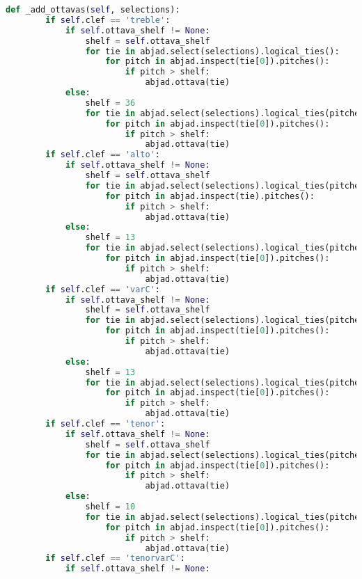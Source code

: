 \begin{lstlisting}[language=Python, caption=ClefHandler]
    def _add_ottavas(self, selections):
        if self.clef == 'treble':
            if self.ottava_shelf != None:
                shelf = self.ottava_shelf
                for tie in abjad.select(selections).logical_ties():
                    for pitch in abjad.inspect(tie[0]).pitches():
                        if pitch > shelf:
                            abjad.ottava(tie)
            else:
                shelf = 36
                for tie in abjad.select(selections).logical_ties(pitched=True):
                    for pitch in abjad.inspect(tie[0]).pitches():
                        if pitch > shelf:
                            abjad.ottava(tie)
        if self.clef == 'alto':
            if self.ottava_shelf != None:
                shelf = self.ottava_shelf
                for tie in abjad.select(selections).logical_ties(pitched=True):
                    for pitch in abjad.inspect(tie).pitches():
                        if pitch > shelf:
                            abjad.ottava(tie)
            else:
                shelf = 13
                for tie in abjad.select(selections).logical_ties(pitched=True):
                    for pitch in abjad.inspect(tie[0]).pitches():
                        if pitch > shelf:
                            abjad.ottava(tie)
        if self.clef == 'varC':
            if self.ottava_shelf != None:
                shelf = self.ottava_shelf
                for tie in abjad.select(selections).logical_ties(pitched=True):
                    for pitch in abjad.inspect(tie[0]).pitches():
                        if pitch > shelf:
                            abjad.ottava(tie)
            else:
                shelf = 13
                for tie in abjad.select(selections).logical_ties(pitched=True):
                    for pitch in abjad.inspect(tie[0]).pitches():
                        if pitch > shelf:
                            abjad.ottava(tie)
        if self.clef == 'tenor':
            if self.ottava_shelf != None:
                shelf = self.ottava_shelf
                for tie in abjad.select(selections).logical_ties(pitched=True):
                    for pitch in abjad.inspect(tie[0]).pitches():
                        if pitch > shelf:
                            abjad.ottava(tie)
            else:
                shelf = 10
                for tie in abjad.select(selections).logical_ties(pitched=True):
                    for pitch in abjad.inspect(tie[0]).pitches():
                        if pitch > shelf:
                            abjad.ottava(tie)
        if self.clef == 'tenorvarC':
            if self.ottava_shelf != None:

\end{lstlisting}
